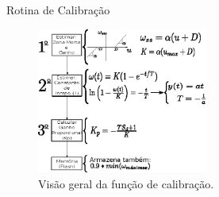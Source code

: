 \begin{frame}{Rotina de Calibração}
    
    \begin{figure}
        \centering
        \includegraphics[width=0.5\textwidth]{figuras/ilustracoes/rotina_de_calibracao.eps}
        \caption{Visão geral da função de calibração.}
    \end{figure}
    
\end{frame}
